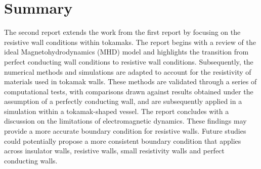 
\chapter{Summary}  %

\ifpdf
    \graphicspath{{Chapter11/Figs/Raster/}{Chapter11/Figs/PDF/}{Chapter11/Figs/}}
\else
    \graphicspath{{Chapter11/Figs/Vector/}{Chapter11/Figs/}}
\fi

\label{chapter 11}



  The second report extends the work from the first report by focusing on the resistive wall conditions within tokamaks. The report begins with a review of the ideal Magnetohydrodynamics (MHD) model and highlights the transition from perfect conducting wall conditions to resistive wall conditions. Subsequently, the numerical methods and simulations are adapted to account for the resistivity of materials used in tokamak walls. These methods are validated through a series of computational tests, with comparisons drawn against results obtained under the assumption of a perfectly conducting wall, and are subsequently applied in a simulation within a tokamak-shaped vessel. The report concludes with a discussion on the limitations of electromagnetic dynamics. These findings may provide a more accurate boundary condition for resistive walls. Future studies could potentially propose a more consistent boundary condition that applies across insulator walls, resistive walls, small resistivity walls and perfect conducting walls.